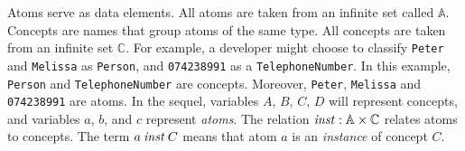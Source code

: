 \documentclass[runningheads]{llncs}
\newcommand{\id}[1]{\text{\it #1\/}}
\newcommand{\instance}{\mathbin{\id{inst}}}
\newcommand{\Pair}[2]{#1\times#2}
\newcommand{\atom}[1]{{\tt\small #1}}
\newcommand{\Atoms}{\mathbb{A}}
\newcommand{\concept}[1]{{\tt\small #1}}
\newcommand{\Concepts}{\mathbb{C}}
\newcommand{\isa}{\preceq}
\begin{document}
   Atoms serve as data elements.
   All atoms are taken from an infinite set called $\Atoms$.
   Concepts are names that group atoms of the same type.
   All concepts are taken from an infinite set $\Concepts$.
   For example, a developer might choose to classify \atom{Peter} and \atom{Melissa} as \concept{Person},
   and \atom{074238991} as a \concept{TelephoneNumber}.
   In this example, \concept{Person} and \concept{TelephoneNumber} are concepts.
   Moreover, \atom{Peter}, \atom{Melissa} and \atom{074238991} are atoms.
   In the sequel, variables $A$, $B$, $C$, $D$ will represent concepts, and variables $a$, $b$, and $c$ represent \emph{atoms}.
   The relation $\instance:\Pair{\Atoms}{\Concepts}$ relates atoms to concepts.
   The term $a\instance C$ means that atom $a$ is an \emph{instance} of concept $C$.

\end{document}
